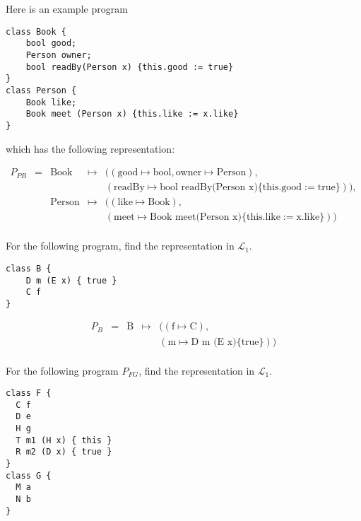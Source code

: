 \frmrule


\begin{example}
Here is an example program
\begin{lstlisting}
class Book {
	bool good;
	Person owner;
	bool readBy(Person x) {this.good := true}
}
class Person {
	Book like;
	Book meet (Person x) {this.like := x.like}
}
\end{lstlisting}

which has the following representation:


\[ \begin{array}{lllll}
P_{PB} & = & \text{Book}   & \mapsto & ((\text{good} \mapsto \text{bool}, 
                                   \text{owner} \mapsto \text{Person}), \\
       &   &               &         &  (\text{readBy} \mapsto \text{bool readBy(Person x)}
                                    \{ \text{this.good} := \text{true} \})), \\
       &   & \text{Person} & \mapsto & ((\text{like} \mapsto \text{Book}), \\
       &   &               &         &  (\text{meet} \mapsto \text{Book meet(Person x)}
                                    \{ \text{this.like} := \text{x.like} \}))	 \\
\end{array}\] 


\end{example}



\begin{example}
For the following program, find the representation in $\mathcal{L}_1$.

\begin{lstlisting}
class B {
	D m (E x) { true }
	C f
}
\end{lstlisting}
\end{example}

\frmrule

\[ \begin{array}{lllll}
P_B & = & \text{B}   & \mapsto & ((\text{f} \mapsto \text{C}), \\ 
    &   &            &         &  (\text{m} \mapsto \text{D m (E x)}
                                    \{ \text{true} \})) \\
\end{array}\] 

\frmrule

\begin{example}
For the following program $P_{FG}$, find the representation in $\mathcal{L}_1$.

\begin{lstlisting}
class F {
  C f
  D e
  H g
  T m1 (H x) { this }
  R m2 (D x) { true }
}
class G {
  M a
  N b
}
\end{lstlisting}
\end{example}

